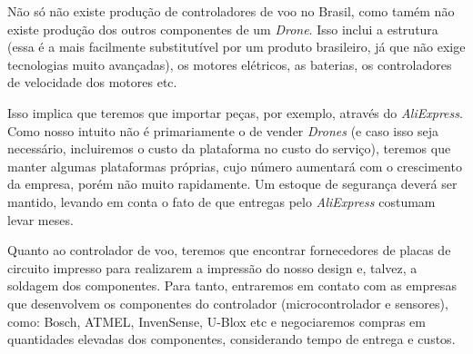 Não só não existe produção de controladores de voo no Brasil, como tamém não existe produção dos outros componentes de um \emph{Drone}. Isso inclui a estrutura (essa
é a mais facilmente substitutível por um produto brasileiro, já que não exige tecnologias muito avançadas), os motores elétricos, as baterias, os controladores de 
velocidade dos motores etc.

Isso implica que teremos que importar peças, por exemplo, através do \emph{AliExpress}. Como nosso intuito não é primariamente o de vender \emph{Drones} (e caso isso
seja necessário, incluiremos o custo da plataforma no custo do serviço), teremos que manter algumas plataformas próprias, cujo número aumentará com o crescimento da empresa,
porém não muito rapidamente.
Um estoque de segurança deverá ser mantido, levando em conta o fato de que entregas pelo \emph{AliExpress} costumam levar meses.

Quanto ao controlador de voo, teremos que encontrar fornecedores de placas de circuito impresso para realizarem a impressão do nosso design e, talvez, a soldagem dos componentes.
Para tanto, entraremos em contato com as empresas que desenvolvem os componentes do controlador (microcontrolador e sensores), como: Bosch, ATMEL, InvenSense, U-Blox etc e 
negociaremos compras em quantidades elevadas dos componentes, considerando tempo de entrega e custos.